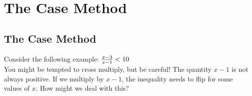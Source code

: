 \newpage

\section{The Case Method}

\subsection{The Case Method}

Consider the following example: $ {x - 3 \over x - 1} < 10 $ \\

You might be tempted to cross multiply, but be careful! The quantity $ x - 1$ is not always positive. If we multiply by $ x - 1$, the inequality needs to flip for some values of $ x $. How might we deal with this? \\

